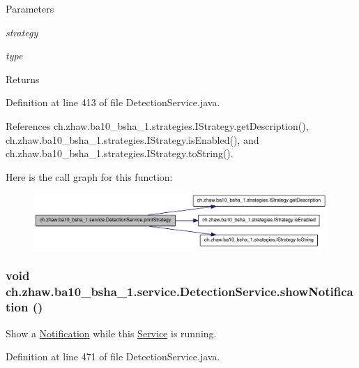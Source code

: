 \begin{DoxyParams}{Parameters}
\item[{\em strategy}]\item[{\em type}]\end{DoxyParams}
\begin{DoxyReturn}{Returns}

\end{DoxyReturn}


Definition at line 413 of file DetectionService.java.

References ch.zhaw.ba10\_\-bsha\_\-1.strategies.IStrategy.getDescription(), ch.zhaw.ba10\_\-bsha\_\-1.strategies.IStrategy.isEnabled(), and ch.zhaw.ba10\_\-bsha\_\-1.strategies.IStrategy.toString().

Here is the call graph for this function:\nopagebreak
\begin{figure}[H]
\begin{center}
\leavevmode
\includegraphics[width=316pt]{classch_1_1zhaw_1_1ba10__bsha__1_1_1service_1_1DetectionService_a201836f7453d62a935b7eed1203b27f6_cgraph}
\end{center}
\end{figure}
\hypertarget{classch_1_1zhaw_1_1ba10__bsha__1_1_1service_1_1DetectionService_a916374be5bffc9ece850bb0cc92d480f}{
\subsubsection[{showNotification}]{\setlength{\rightskip}{0pt plus 5cm}void ch.zhaw.ba10\_\-bsha\_\-1.service.DetectionService.showNotification ()}}
\label{classch_1_1zhaw_1_1ba10__bsha__1_1_1service_1_1DetectionService_a916374be5bffc9ece850bb0cc92d480f}
Show a \hyperlink{}{Notification} while this \hyperlink{}{Service} is running. 

Definition at line 471 of file DetectionService.java.

